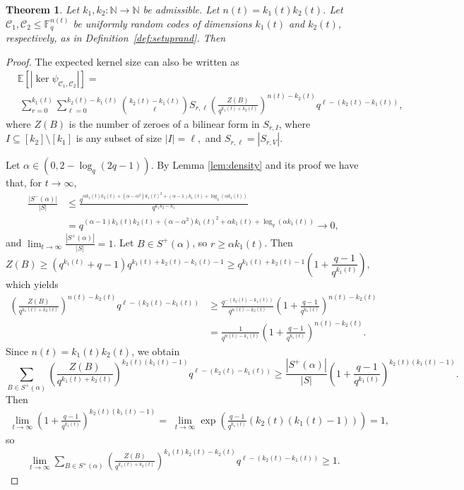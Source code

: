 \documentclass[a4paper,11pt,reqno]{article}
\newcommand{\F}{\mathbb{F}}
\newcommand{\E}{\mathbb E}
\newcommand{\C}{\mathcal{C}}
\theoremstyle{plain} \numberwithin{equation}{section}
\newtheorem{theorem}{Theorem}[section]
\theoremstyle{definition}
\begin{document}
\begin{theorem}\label{thm:asympkerneldimension2}
Let $k_1,k_2\colon \mathbb{N}\rightarrow \mathbb{N}$ be admissible. Let $n(t)=k_1(t)k_2(t)$. Let $\C_1, \C_2 \leq \F_q^{n(t)}$ be uniformly random codes of dimensions $k_1(t)$ and $k_2(t)$, respectively, as in Definition~\ref{def:setuprand}. Then 
\smash{$\lim_{t\rightarrow \infty} \E [|\ker \psi_{\C_1,\C_2}|] = 2.$}
\end{theorem}\begin{proof}
The expected kernel size can also be written as
\begin{align*}
    &\E[ |\ker {\psi_{\C_1,\C_2}}|] =\\
    &\:\sum_{r=0}^{k_1(t)}\sum_{\ell = 0}^{k_2(t)-k_1(t)} \binom{k_2(t)-k_1(t)}{\ell} S_{r,\ell} \left(  \frac{Z(B)}{q^{k_1(t)+k_2(t)}}\right)^{n(t)-k_2(t)} q^{\ell - (k_2(t)-k_1(t))},
\end{align*}
where $Z(B)$ is the number of zeroes of a bilinear form in $S_{r,I}$, where $I\subseteq [k_2]\setminus [k_1]$ is any subset of size $|I|=\ell,$ and $S_{r,\ell} = |S_{r,V}|$.

Let $\alpha\in(0,2-\log_q(2q-1))$. By Lemma \ref{lem:density} and its proof we have that, for $t\rightarrow \infty$,
\begin{align}
\frac{|S^-(\alpha)|}{|S|} &\leq \frac{q^{\alpha k_1(t) k_2(t) + (\alpha -\alpha^2)k_1(t)^2 + (\alpha-1)k_1(t) + \log_q(\alpha k_1(t))}}{q^{k_1 k_2 -k_1}}  \nonumber \\
&= q^{(\alpha-1) k_1(t) k_2(t) + (\alpha -\alpha^2)k_1(t)^2 + \alpha k_1(t) + \log_q(\alpha k_1(t))} \rightarrow 0, \label{eq:Sminus3}
\end{align}
and $\lim_{t \rightarrow \infty} \frac{|S^+(\alpha)|}{|S|} = 1$. Let $B\in S^+(\alpha)$, so $r\geq \alpha k_1(t)$. Then
$$Z(B) \geq (q^{k_1(t)}+q-1)q^{k_1(t)+k_2(t)-k_1(t)-1} \geq  q^{k_1(t)+k_2(t)-1}\left(1 + \frac{q-1}{q^{k_1(t)}}\right),$$
which yields
\begin{align*}
    \left( \frac{Z(B)}{q^{k_1(t)+k_2(t)}} \right)^{n(t)-k_2(t)} q^{\ell -(k_2(t)-k_1(t))} &\geq \frac{q^{-(k_2(t)-k_1(t))}}{q^{n(t)-k_2(t)}}\left(1 + \frac{q-1}{q^{k_1(t)}}\right)^{n(t)-k_2(t)} \\ 
    &= \frac{1}{q^{n(t)-k_1(t)}}\left(1 + \frac{q-1}{q^{k_1(t)}}\right)^{n(t)-k_2(t)}.
\end{align*}
Since $n(t)=k_1(t)k_2(t)$, we obtain
\[
\sum_{B\in S^+(\alpha)} \left( \frac{Z(B)}{q^{k_1(t)+k_2(t)}} \right)^{k_2(t)(k_1(t)-1)} q^{\ell -(k_2(t)-k_1(t))} \geq \frac{|S^+(\alpha)|}{|S|}\left(1 + \frac{q-1}{q^{k_1(t)}}\right)^{k_2(t)(k_1(t)-1)}.
\]
Then
\begin{align*}
    \lim_{t\rightarrow \infty}  \left(1 + \frac{q-1}{q^{k_1(t)}}\right)^{k_2(t)(k_1(t)-1)} 
    =\; \lim_{t\rightarrow \infty} \exp \left( \frac{q-1}{q^{k_1(t)}} (k_2(t)(k_1(t)-1)) \right)
    = 1,
\end{align*}
so
\begin{align} \label{eq:upperboundthis}
 \lim_{t\rightarrow \infty} \sum_{B\in S^+(\alpha)} \left( \frac{Z(B)}{q^{k_1(t)+k_2(t)}} \right)^{k_1(t)k_2(t)-k_2(t)} q^{\ell -(k_2(t)-k_1(t))} \geq 1.
\end{align}



\end{proof}
\end{document}
